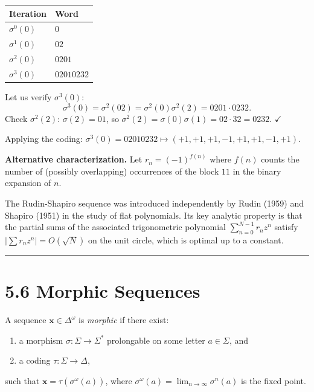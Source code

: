 \begin{example}

\begin{tabular}{|l|l|}
\hline
Iteration & Word \\
\hline
$\sigma^0(0)$ & $0$ \\
$\sigma^1(0)$ & $02$ \\
$\sigma^2(0)$ & $0201$ \\
$\sigma^3(0)$ & $02010232$ \\
\hline
\end{tabular}


Let us verify $\sigma^3(0)$:
\[
\sigma^3(0) = \sigma^2(02) = \sigma^2(0)\sigma^2(2) = 0201 \cdot 0232.
\]
Check $\sigma^2(2)$: $\sigma(2) = 01$, so $\sigma^2(2) = \sigma(0)\sigma(1) = 02 \cdot 32 = 0232$. $\checkmark$

Applying the coding: $\sigma^3(0) = 02010232 \mapsto (+1,+1,+1,-1,+1,+1,-1,+1)$.

\textbf{Alternative characterization.} Let $r_n = (-1)^{f(n)}$ where $f(n)$ counts the number of (possibly overlapping) occurrences of the block $11$ in the binary expansion of $n$.

The Rudin-Shapiro sequence was introduced independently by Rudin (1959) and Shapiro (1951) in the study of flat polynomials. Its key analytic property is that the partial sums of the associated trigonometric polynomial $\sum_{n=0}^{N-1} r_n z^n$ satisfy $|\sum r_n z^n| = O(\sqrt{N})$ on the unit circle, which is optimal up to a constant.

\bigskip\hrule\bigskip
\end{example}

\section{5.6 Morphic Sequences}

\begin{definition}
A sequence $\mathbf{x} \in \Delta^\omega$ is \textit{morphic} if there exist:
\end{definition}
\begin{enumerate}
  \item a morphism $\sigma: \Sigma \to \Sigma^*$ prolongable on some letter $a \in \Sigma$, and
  \item a coding $\tau: \Sigma \to \Delta$,
\end{enumerate}

such that $\mathbf{x} = \tau(\sigma^\omega(a))$, where $\sigma^\omega(a) = \lim_{n\to\infty} \sigma^n(a)$ is the fixed point.

